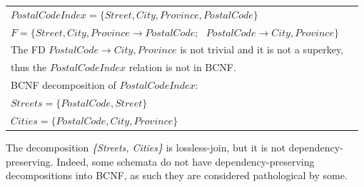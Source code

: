 \begin{center}
\begin{tabular}[h]{l l}
  $PostalCodeIndex = \{Street, City, Province, PostalCode\}$ & \\ [0.5ex]
  $F = \{Street, City, Province \rightarrow PostalCode; \mbox{ } PostalCode \rightarrow City, Province\}$ \\ [1.5ex]
  The FD $PostalCode \rightarrow City, Province$ is not trivial and it is not a superkey, \\ [0.5ex]
  thus the $PostalCodeIndex$ relation is not in BCNF. & \\ [1.5ex]
  BCNF decomposition of $PostalCodeIndex$:   &  \\ [0.5ex]
  $Streets =\{PostalCode, Street\}$ & \\ [0.5ex]
  $Cities = \{PostalCode, City, Province\}$ & \\ [0.5ex]
\end{tabular}
\end{center}

The decomposition \textit{\{Streets, Cities\}} is lossless-join, but it is not dependency-preserving. 
Indeed, some schemata do not have dependency-preserving decompositions
into BCNF, as such they are considered pathological by some.
